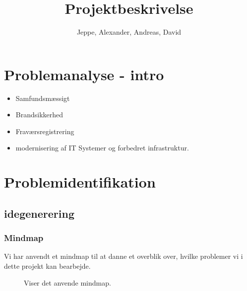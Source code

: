 \documentclass[12pt, a4paper]{article}
\title{Projektbeskrivelse}
\author{Jeppe, Alexander, Andreas, David}
\date{}
\begin{document}
\maketitle
\section{Problemanalyse - intro}
    \begin{itemize}
    \item Samfundsmæssigt
    \item Brandsikkerhed
    \item Fraværsregistrering 
    \item modernisering af IT Systemer og forbedret infrastruktur.
    \end{itemize}
\section{Problemidentifikation}
\subsection{idegenerering}
\subsubsection{Mindmap}
Vi har anvendt et mindmap til at danne et overblik over, hvilke problemer vi i dette projekt kan bearbejde.
\begin{figure}[H]
    \centering
    \caption{Viser det anvende mindmap.}
\end{figure}
\end{document}
